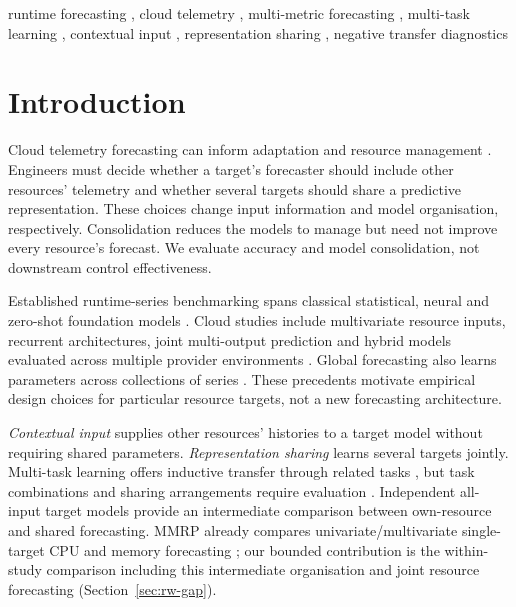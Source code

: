 \documentclass[a4paper,fleqn]{cas-dc}
\begin{document}
\begin{keywords}
runtime forecasting \sep
cloud telemetry \sep
multi-metric forecasting \sep
multi-task learning \sep
contextual input \sep
representation sharing \sep
negative transfer diagnostics
\end{keywords}

\maketitle

\section{Introduction}
\label{sec:introduction}

Cloud telemetry forecasting can inform adaptation and resource management
\citep{Taherizadeh2018Monitoring,Bauer2020SelfAware}.
Engineers must decide whether a target's forecaster should include other
resources' telemetry and whether several targets should share a predictive
representation. These choices change input information and model organisation,
respectively. Consolidation reduces the models to manage but need not improve
every resource's forecast. We evaluate accuracy and model consolidation,
not downstream control effectiveness.

Established runtime-series benchmarking spans
classical statistical, neural and zero-shot foundation models
\citep{DiMenna2026RuntimeForecasting}. Cloud studies include multivariate
resource inputs, recurrent architectures, joint multi-output prediction and
hybrid models evaluated across multiple provider environments
\citep{Ullah2023CloudBiLSTM,Tripathi2025MMRP}. Global forecasting also learns
parameters across collections of series \citep{Salinas2020DeepAR}.
These precedents motivate empirical design choices for particular resource
targets, not a new forecasting architecture.

\emph{Contextual input} supplies other resources' histories to a target model
without requiring shared parameters. \emph{Representation sharing} learns
several targets jointly. Multi-task learning
offers inductive transfer through related tasks \citep{Caruana1997Multitask},
but task combinations and sharing arrangements require evaluation
\citep{Standley2020TaskGrouping,Fifty2021TaskGroupings,Nochumsohn2025MTLinear}.
Independent all-input target models provide an intermediate comparison
between own-resource and shared forecasting. MMRP already compares
univariate/multivariate single-target CPU and memory forecasting
\citep{Tripathi2025MMRP}; our bounded contribution is the within-study
comparison including this intermediate organisation and joint resource
forecasting (Section~\ref{sec:rw-gap}).
\end{document}
